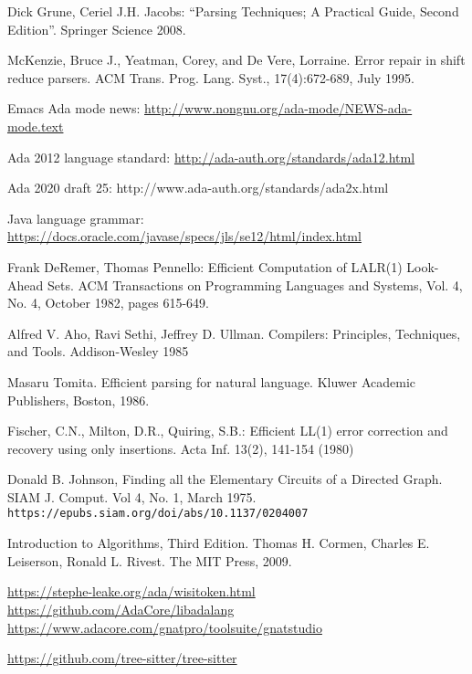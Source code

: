 \documentclass[authordraft]{acmart}
\begin{document}
\begin{thebibliography}{9}

 Dick Grune, Ceriel J.H. Jacobs: ``Parsing Techniques; A Practical Guide, Second
  Edition''. Springer Science  2008.

 McKenzie, Bruce J., Yeatman, Corey, and De
  Vere, Lorraine. Error repair in shift reduce parsers. ACM Trans.
  Prog. Lang. Syst., 17(4):672-689, July 1995.

Emacs Ada mode news:
  \url{http://www.nongnu.org/ada-mode/NEWS-ada-mode.text}

Ada 2012 language standard:
  \url{http://ada-auth.org/standards/ada12.html}

Ada 2020 draft 25: http://www.ada-auth.org/standards/ada2x.html

Java language grammar:
  \url{https://docs.oracle.com/javase/specs/jls/se12/html/index.html}

 Frank DeRemer, Thomas Pennello: Efficient
  Computation of LALR(1) Look-Ahead Sets. ACM Transactions on
  Programming Languages and Systems, Vol. 4, No. 4, October 1982,
  pages 615-649.

Alfred V. Aho, Ravi Sethi, Jeffrey D. Ullman.
  Compilers: Principles, Techniques, and Tools. Addison-Wesley 1985

 Masaru Tomita. Efficient parsing for natural language. Kluwer Academic Publishers, Boston, 1986.

Fischer, C.N., Milton, D.R., Quiring, S.B.:
  Efficient LL(1) error correction and recovery using only insertions.
  Acta Inf. 13(2), 141-154 (1980)

Donald B. Johnson, Finding all the Elementary Circuits of a Directed Graph.
SIAM J. Comput. Vol 4, No. 1, March 1975.\\ \verb|https://epubs.siam.org/doi/abs/10.1137/0204007|

 Introduction to Algorithms, Third Edition.
    Thomas H. Cormen, Charles E. Leiserson, Ronald L. Rivest. The MIT
    Press, 2009.

\url{https://stephe-leake.org/ada/wisitoken.html}
\url{https://github.com/AdaCore/libadalang}
\url{https://www.adacore.com/gnatpro/toolsuite/gnatstudio}

\url{https://github.com/tree-sitter/tree-sitter}

\end{thebibliography}
\end{document}
